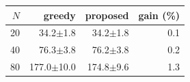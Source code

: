\begin{tabular}{rrrr}\toprule $N$ & greedy & proposed & gain (\%)\\\midrule
20 & 34.2$\pm$1.8 & 34.2$\pm$1.8 & 0.1\\
40 & 76.3$\pm$3.8 & 76.2$\pm$3.8 & 0.2\\
80 & 177.0$\pm$10.0 & 174.8$\pm$9.6 & 1.3\\
\bottomrule\end{tabular}
